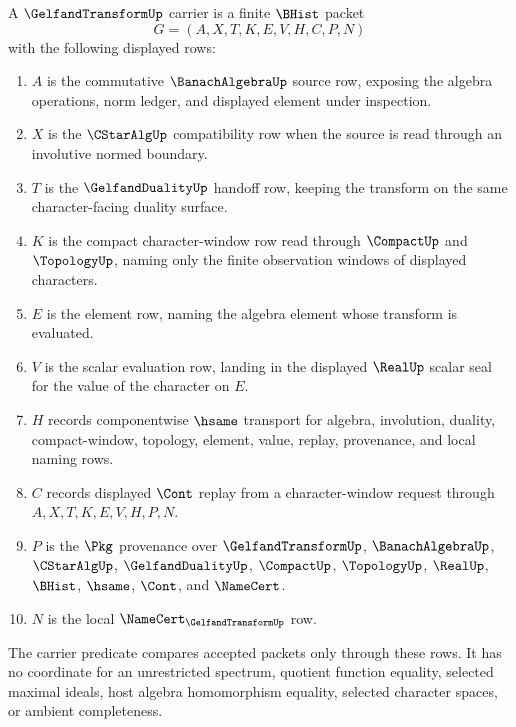 \begin{definition}
\label{def:gelfand-transform-carrier}
A $\GelfandTransformUp$ carrier is a finite $\BHist$ packet
$$
G=(A,X,T,K,E,V,H,C,P,N)
$$
with the following displayed rows:
\begin{enumerate}
\item $A$ is the commutative $\BanachAlgebraUp$ source row, exposing the algebra operations, norm ledger, and displayed element under inspection.
\item $X$ is the $\CStarAlgUp$ compatibility row when the source is read through an involutive normed boundary.
\item $T$ is the $\GelfandDualityUp$ handoff row, keeping the transform on the same character-facing duality surface.
\item $K$ is the compact character-window row read through $\CompactUp$ and $\TopologyUp$, naming only the finite observation windows of displayed characters.
\item $E$ is the element row, naming the algebra element whose transform is evaluated.
\item $V$ is the scalar evaluation row, landing in the displayed $\RealUp$ scalar seal for the value of the character on $E$.
\item $H$ records componentwise $\hsame$ transport for algebra, involution, duality, compact-window, topology, element, value, replay, provenance, and local naming rows.
\item $C$ records displayed $\Cont$ replay from a character-window request through $A,X,T,K,E,V,H,P,N$.
\item $P$ is the $\Pkg$ provenance over $\GelfandTransformUp$, $\BanachAlgebraUp$, $\CStarAlgUp$, $\GelfandDualityUp$, $\CompactUp$, $\TopologyUp$, $\RealUp$, $\BHist$, $\hsame$, $\Cont$, and $\NameCert$.
\item $N$ is the local $\NameCert_{\GelfandTransformUp}$ row.
\end{enumerate}
The carrier predicate compares accepted packets only through these rows. It has no coordinate for an unrestricted spectrum, quotient function equality, selected maximal ideals, host algebra homomorphism equality, selected character spaces, or ambient completeness.
\end{definition}

